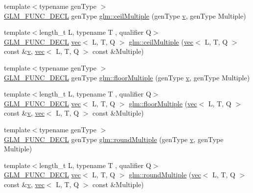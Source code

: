 \begin{DoxyCompactItemize}
\item 
{\footnotesize template$<$typename gen\+Type $>$ }\\\hyperlink{setup_8hpp_ab2d052de21a70539923e9bcbf6e83a51}{G\+L\+M\+\_\+\+F\+U\+N\+C\+\_\+\+D\+E\+CL} gen\+Type \hyperlink{group__gtc__round_ga1d89ac88582aaf4d5dfa5feb4a376fd4}{glm\+::ceil\+Multiple} (gen\+Type \hyperlink{_s_d_l__opengl_8h_a10a82eabcb59d2fcd74acee063775f90}{v}, gen\+Type Multiple)
\item 
{\footnotesize template$<$length\+\_\+t L, typename T , qualifier Q$>$ }\\\hyperlink{setup_8hpp_ab2d052de21a70539923e9bcbf6e83a51}{G\+L\+M\+\_\+\+F\+U\+N\+C\+\_\+\+D\+E\+CL} \hyperlink{structglm_1_1vec}{vec}$<$ L, T, Q $>$ \hyperlink{group__gtc__round_gab77fdcc13f8e92d2e0b1b7d7aeab8e9d}{glm\+::ceil\+Multiple} (\hyperlink{structglm_1_1vec}{vec}$<$ L, T, Q $>$ const \&\hyperlink{_s_d_l__opengl_8h_a10a82eabcb59d2fcd74acee063775f90}{v}, \hyperlink{structglm_1_1vec}{vec}$<$ L, T, Q $>$ const \&Multiple)
\item 
{\footnotesize template$<$typename gen\+Type $>$ }\\\hyperlink{setup_8hpp_ab2d052de21a70539923e9bcbf6e83a51}{G\+L\+M\+\_\+\+F\+U\+N\+C\+\_\+\+D\+E\+CL} gen\+Type \hyperlink{group__gtc__round_ga2ffa3cd5f2ea746ee1bf57c46da6315e}{glm\+::floor\+Multiple} (gen\+Type \hyperlink{_s_d_l__opengl_8h_a10a82eabcb59d2fcd74acee063775f90}{v}, gen\+Type Multiple)
\item 
{\footnotesize template$<$length\+\_\+t L, typename T , qualifier Q$>$ }\\\hyperlink{setup_8hpp_ab2d052de21a70539923e9bcbf6e83a51}{G\+L\+M\+\_\+\+F\+U\+N\+C\+\_\+\+D\+E\+CL} \hyperlink{structglm_1_1vec}{vec}$<$ L, T, Q $>$ \hyperlink{group__gtc__round_gacdd8901448f51f0b192380e422fae3e4}{glm\+::floor\+Multiple} (\hyperlink{structglm_1_1vec}{vec}$<$ L, T, Q $>$ const \&\hyperlink{_s_d_l__opengl_8h_a10a82eabcb59d2fcd74acee063775f90}{v}, \hyperlink{structglm_1_1vec}{vec}$<$ L, T, Q $>$ const \&Multiple)
\item 
{\footnotesize template$<$typename gen\+Type $>$ }\\\hyperlink{setup_8hpp_ab2d052de21a70539923e9bcbf6e83a51}{G\+L\+M\+\_\+\+F\+U\+N\+C\+\_\+\+D\+E\+CL} gen\+Type \hyperlink{group__gtc__round_gab892defcc9c0b0618df7251253dc0fbb}{glm\+::round\+Multiple} (gen\+Type \hyperlink{_s_d_l__opengl_8h_a10a82eabcb59d2fcd74acee063775f90}{v}, gen\+Type Multiple)
\item 
{\footnotesize template$<$length\+\_\+t L, typename T , qualifier Q$>$ }\\\hyperlink{setup_8hpp_ab2d052de21a70539923e9bcbf6e83a51}{G\+L\+M\+\_\+\+F\+U\+N\+C\+\_\+\+D\+E\+CL} \hyperlink{structglm_1_1vec}{vec}$<$ L, T, Q $>$ \hyperlink{group__gtc__round_ga2f1a68332d761804c054460a612e3a4b}{glm\+::round\+Multiple} (\hyperlink{structglm_1_1vec}{vec}$<$ L, T, Q $>$ const \&\hyperlink{_s_d_l__opengl_8h_a10a82eabcb59d2fcd74acee063775f90}{v}, \hyperlink{structglm_1_1vec}{vec}$<$ L, T, Q $>$ const \&Multiple)
\end{DoxyCompactItemize}


